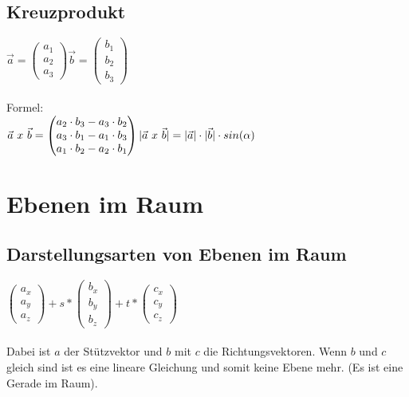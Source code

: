 \subsection{Kreuzprodukt}
$
\vec{a} = 
\begin{pmatrix}
    a_1 \\ a_2 \\ a_3
\end{pmatrix}
\vec{b} =
\begin{pmatrix}
    b_1 \\ b_2 \\ b_3
\end{pmatrix}
$
\\\\
Formel: \\
$
\vec{a}\ x\ \vec{b} = 
\begin{pmatrix}
    a_2 \cdot b_3 - a_3 \cdot b_2 \\
    a_3 \cdot b_1 - a_1 \cdot b_3 \\
    a_1 \cdot b_2 - a_2 \cdot b_1 \\
\end{pmatrix}
\\\\
|\vec{a} \ x \ \vec{b}| = |\vec{a}| \cdot |\vec{b}| \cdot sin(\alpha)
$

\section{Ebenen im Raum}
\subsection{Darstellungsarten von Ebenen im Raum}
$
\begin{pmatrix}
    a_x \\ a_y \\ a_z
\end{pmatrix}
+ s * 
\begin{pmatrix}
    b_x \\ b_y \\ b_z
\end{pmatrix}
+ t * 
\begin{pmatrix}
    c_x \\ c_y \\ c_z
\end{pmatrix}
$ 
\\\\
Dabei ist $a$ der Stützvektor und $b$ mit $c$ die Richtungsvektoren.
Wenn $b$ und $c$ gleich sind ist es eine lineare Gleichung und somit keine Ebene mehr. 
(Es ist eine Gerade im Raum).

